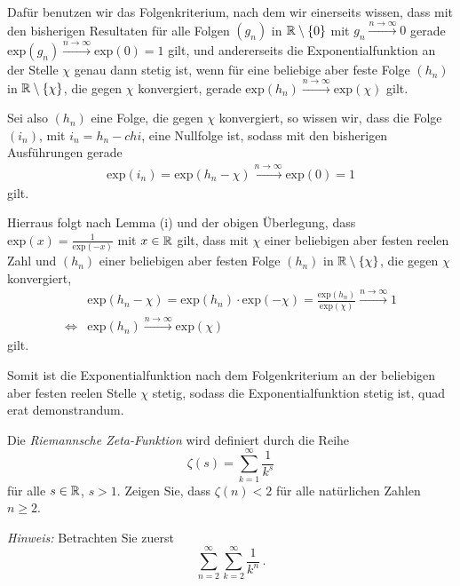 \begin{lsg}
\begin{enumerate}[label=$\mathrm{(\roman*)}$, ref=$\mathrm{\roman*}$]
Dafür benutzen wir das Folgenkriterium, nach dem wir einerseits wissen, dass mit den bisherigen Resultaten für alle Folgen $(g_n)$ in $\mathbb{R} \setminus \{0\}$ mit $g_n \stackrel{n\to \infty}{\to}0$  gerade $\textrm{exp}(g_n) \stackrel{n\to \infty}{\to}\textrm{exp}(0)=1$ gilt, und andererseits die Exponentialfunktion an der Stelle $\chi$ genau dann stetig ist, wenn für eine beliebige aber feste Folge $(h_n)$ in $\mathbb{R}\setminus \{\chi\}$, die gegen $\chi$ konvergiert, gerade  $\textrm{exp}(h_n) \stackrel{n\to \infty}{\to}\textrm{exp}(\chi)$ gilt.

Sei also $(h_n)$ eine Folge, die gegen $\chi$ konvergiert, so wissen wir, dass die Folge $(i_n)$, mit $i_n=h_n-chi$, eine Nullfolge ist, sodass mit den bisherigen Ausführungen gerade
\begin{align*}
 \textrm{exp}(i_n)= \textrm{exp}(h_n-\chi) \stackrel{n\to \infty}{\to}\textrm{exp}(0)=1
\end{align*} gilt.

Hierraus folgt nach Lemma (i) und der obigen Überlegung, dass $\textrm{exp}(x)= \frac{1}{\textrm{exp}(-x)}$ mit $x \in \mathbb{R}$ gilt, dass mit $\chi$ einer beliebigen aber festen reelen Zahl und $(h_n)$ einer beliebigen aber festen Folge $(h_n)$ in $\mathbb{R}\setminus \{\chi\}$, die gegen $\chi$ konvergiert,
\begin{align*}
&\textrm{exp}(h_n-\chi)= \textrm{exp}(h_n) \cdot \textrm{exp}(-\chi)= \frac{\textrm{exp}(h_n)}{\textrm{exp}(\chi)}  \stackrel{n\to \infty}{\to}1\\ \Leftrightarrow &\textrm{exp}(h_n) \stackrel{n\to \infty}{\to}\textrm{exp}(\chi)
\end{align*} gilt.
 
Somit ist die Exponentialfunktion nach dem Folgenkriterium an der beliebigen aber festen reelen Stelle $\chi$ stetig, sodass die Exponentialfunktion stetig ist, quad erat demonstrandum.

\end{enumerate}
\end{lsg}

\bigskip


\begin{aufg}[6 Punkte]
Die \textit{Riemannsche Zeta-Funktion} wird definiert durch die Reihe 
\[
\zeta(s) = \sum_{k=1}^{\infty} \frac{1}{k^{s}}
\]
f\"ur alle $s\in \mathbb{R}$, $s>1$. Zeigen Sie, dass $\zeta(n) < 2$ f\"ur alle nat\"urlichen Zahlen $n\geq 2$. 

\noindent
\emph{Hinweis:} Betrachten Sie zuerst
\[
\sum_{n=2}^{\infty} \sum_{k=2}^{\infty} \frac{1}{k^{n}}\,.
\]
\end{aufg}


